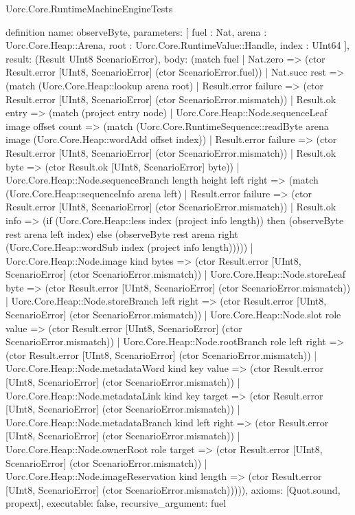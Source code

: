 \begin{lexlean}{Uorc.Core.RuntimeMachineEngineTests}
\begin{semanticmodule}
definition{
  name: observeByte,
  parameters: [
    fuel : Nat,
    arena : Uorc.Core.Heap::Arena,
    root : Uorc.Core.RuntimeValue::Handle,
    index : UInt64
  ],
  result: (Result UInt8 ScenarioError),
  body: (match fuel
    | Nat.zero => (ctor Result.error [UInt8, ScenarioError] (ctor ScenarioError.fuel))
    | Nat.succ rest => (match (Uorc.Core.Heap::lookup arena root)
      | Result.error failure => (ctor Result.error [UInt8, ScenarioError] (ctor ScenarioError.mismatch))
      | Result.ok entry => (match (project entry node)
        | Uorc.Core.Heap::Node.sequenceLeaf image offset count => (match (Uorc.Core.RuntimeSequence::readByte arena image (Uorc.Core.Heap::wordAdd offset index))
          | Result.error failure => (ctor Result.error [UInt8, ScenarioError] (ctor ScenarioError.mismatch))
          | Result.ok byte => (ctor Result.ok [UInt8, ScenarioError] byte))
        | Uorc.Core.Heap::Node.sequenceBranch length height left right => (match (Uorc.Core.Heap::sequenceInfo arena left)
          | Result.error failure => (ctor Result.error [UInt8, ScenarioError] (ctor ScenarioError.mismatch))
          | Result.ok info => (if (Uorc.Core.Heap::less index (project info length)) then (observeByte rest arena left index) else (observeByte rest arena right (Uorc.Core.Heap::wordSub index (project info length)))))
        | Uorc.Core.Heap::Node.image kind bytes => (ctor Result.error [UInt8, ScenarioError] (ctor ScenarioError.mismatch))
        | Uorc.Core.Heap::Node.storeLeaf byte => (ctor Result.error [UInt8, ScenarioError] (ctor ScenarioError.mismatch))
        | Uorc.Core.Heap::Node.storeBranch left right => (ctor Result.error [UInt8, ScenarioError] (ctor ScenarioError.mismatch))
        | Uorc.Core.Heap::Node.slot role value => (ctor Result.error [UInt8, ScenarioError] (ctor ScenarioError.mismatch))
        | Uorc.Core.Heap::Node.rootBranch role left right => (ctor Result.error [UInt8, ScenarioError] (ctor ScenarioError.mismatch))
        | Uorc.Core.Heap::Node.metadataWord kind key value => (ctor Result.error [UInt8, ScenarioError] (ctor ScenarioError.mismatch))
        | Uorc.Core.Heap::Node.metadataLink kind key target => (ctor Result.error [UInt8, ScenarioError] (ctor ScenarioError.mismatch))
        | Uorc.Core.Heap::Node.metadataBranch kind left right => (ctor Result.error [UInt8, ScenarioError] (ctor ScenarioError.mismatch))
        | Uorc.Core.Heap::Node.ownerRoot role target => (ctor Result.error [UInt8, ScenarioError] (ctor ScenarioError.mismatch))
        | Uorc.Core.Heap::Node.imageReservation kind length => (ctor Result.error [UInt8, ScenarioError] (ctor ScenarioError.mismatch))))),
  axioms: [Quot.sound, propext],
  executable: false,
  recursive_argument: fuel
}


\end{semanticmodule}
\end{lexlean}
